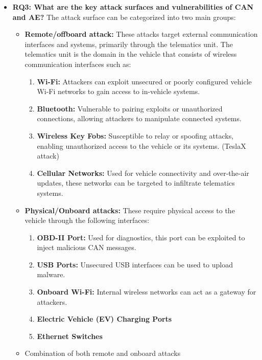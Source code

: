 \documentclass{report}
\begin{document}
\begin{itemize}
    \item \textbf{RQ3: What are the key attack surfaces and vulnerabilities of CAN and AE?}
        The attack surface can be categorized into two main groups:

        \begin{itemize}
            \item \textbf{Remote/offboard attack:} These attacks target external communication interfaces and systems, primarily through the telematics unit. The telematics unit is the domain in the vehicle that consists of wireless communication interfaces such as:
            \begin{enumerate}
                \item \textbf{Wi-Fi:} Attackers can exploit unsecured or poorly configured vehicle Wi-Fi networks to gain access to in-vehicle systems.
                \item \textbf{Bluetooth:} Vulnerable to pairing exploits or unauthorized connections, allowing attackers to manipulate connected systems.
                \item \textbf{Wireless Key Fobs:} Susceptible to relay or spoofing attacks, enabling unauthorized access to the vehicle or its systems. (TeslaX attack)
                \item \textbf{Cellular Networks:} Used for vehicle connectivity and over-the-air updates, these networks can be targeted to infiltrate telematics systems.
            \end{enumerate}

            \item \textbf{Physical/Onboard attacks:} These require physical access to the vehicle through the following interfaces:
            \begin{enumerate}
                \item \textbf{OBD-II Port:} Used for diagnostics, this port can be exploited to inject malicious CAN messages.
                \item \textbf{USB Ports:} Unsecured USB interfaces can be used to upload malware.
                \item \textbf{Onboard Wi-Fi:} Internal wireless networks can act as a gateway for attackers.
                \item \textbf{Electric Vehicle (EV) Charging Ports}
                \item \textbf{Ethernet Switches}
            \end{enumerate}

            \item Combination of both remote and onboard attacks
        \end{itemize}
            

\end{itemize}
\end{document}
